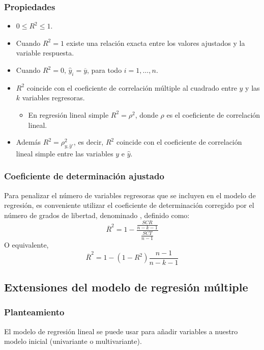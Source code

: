 \subsubsection{Propiedades}
\begin{itemize}
	\item $0\le R^2\le1$.
	\item Cuando $R^2=1$ existe una relación exacta entre los valores ajustados y la variable respuesta.
	\item Cuando $R^2=0,\,\hat{y}_i=\overline{y}$, para todo $i=1,\dots,n$.
	\item $R^2$ coincide con el coeficiente de correlación múltiple al cuadrado entre $y$ y las $k$ variables regresoras.
	\begin{itemize}
		\item En regresión lineal simple $R^2=\rho^2$, donde $\rho$ es el coeficiente de correlación lineal.
	\end{itemize}
	\item Además $R^2=\rho_{y,\hat{y}'}^2$, es decir, $R^2$ coincide con el coeficiente de correlación lineal simple entre las variables $y$ e $\hat{y}$.
\end{itemize}
\subsubsection{Coeficiente de determinación ajustado}
Para penalizar el número de variables regresoras que se incluyen en el modelo de regresión, es conveniente utilizar el coeficiente de determinación corregido por el número de grados de libertad, denominado , definido como: \[ \overline{R}^2=1-\dfrac{\frac{SCR}{n-k-1}}{\frac{SCT}{n-1}} \]
O equivalente, \[ \overline{R}^2=1-(1-R^2)\dfrac{n-1}{n-k-1} \]
\subsection{Extensiones del modelo de regresión múltiple}
\subsubsection{Planteamiento}
El modelo de regresión lineal se puede usar para añadir variables a nuestro modelo inicial (univariante o multivariante).

